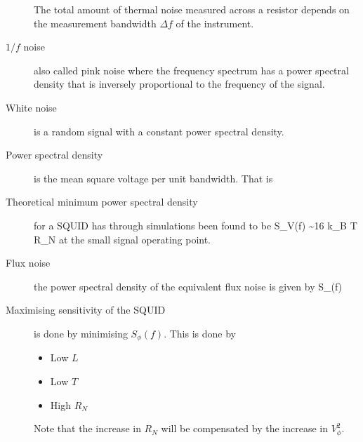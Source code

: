 \begin{description}
The total amount of thermal noise measured across a resistor depends on the measurement bandwidth $\Delta f$ of the instrument. 

\item[$1/f$ noise] also called pink noise where the frequency spectrum has a power spectral density that is inversely proportional to the frequency of the signal. 

\item[White noise] is a random signal with a constant power spectral density. 

\item[Power spectral density] is the mean square voltage per unit bandwidth. That is
\beq
{}
\eeq

\item[Theoretical minimum power spectral density] for a SQUID has through simulations been found to be
\beq
S_V(f) \sim 16 k_B T R_N
\eeq
at the small signal operating point. 

\item[Flux noise] the power spectral density of the equivalent flux noise is given by 
\beq
S_\phi(f)  \simeq {}
\eeq

\item[Maximising sensitivity of the SQUID] is done by minimising $S_\phi(f)$. This is done by 
\begin{itemize}
\item Low $L$
\item Low $T$
\item High $R_N$
\end{itemize}
Note that the increase in $R_N$ will be compensated by the increase in $V^2_\phi$. 






\end{description}
